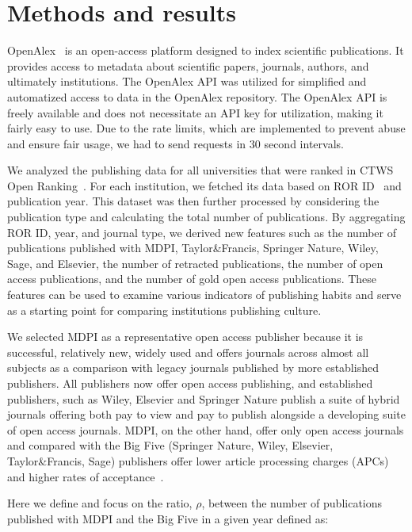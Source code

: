 \documentclass[amsfonts, amssymb, prl, superscriptaddress, notitlepage, twocolumn, nofootinbib]{revtex4-2}
\begin{document}
\section{Methods and results}
OpenAlex~\cite{priem2022openalex} is an open-access platform designed to index scientific publications. It provides access to metadata about scientific papers, journals, authors, and ultimately institutions. The OpenAlex API was utilized for simplified and automatized access to data in the OpenAlex repository. The OpenAlex API is freely available and does not necessitate an API key for utilization, making it fairly easy to use. Due to the rate limits, which are implemented to prevent abuse and ensure fair usage, we had to send requests in 30 second intervals. 

We analyzed the publishing data for all universities that were ranked in CTWS Open Ranking~\cite{cwts2024leiden}. For each institution, we fetched its data based on ROR ID~\cite{ROR} and publication year. This dataset was then further processed by considering the publication type and calculating the total number of publications. By aggregating ROR ID, year, and journal type, we derived new features such as the number of publications published with MDPI, Taylor\&Francis, Springer Nature, Wiley, Sage, and Elsevier, the number of retracted publications, the number of open access publications, and the number of gold open access publications. These features can be used to examine various indicators of publishing habits and serve as a starting point for comparing institutions publishing culture. 

We selected MDPI as a representative open access publisher because it is successful, relatively new, widely used and offers journals across almost all subjects as a comparison with legacy journals published by more established publishers. All publishers now offer open access publishing, and established publishers, such as Wiley, Elsevier and Springer Nature publish a suite of hybrid journals offering both pay to view and pay to publish alongside a developing suite of open access journals. MDPI, on the other hand, offer only open access journals and compared with the Big Five (Springer Nature, Wiley, Elsevier, Taylor\&Francis, Sage) publishers offer lower article processing charges (APCs) and higher rates of acceptance~\cite{fillon2024should}. 

Here we define and focus on the ratio, $\rho$, between the number of publications published with MDPI and the Big Five in a given year defined as: 
\end{document}
